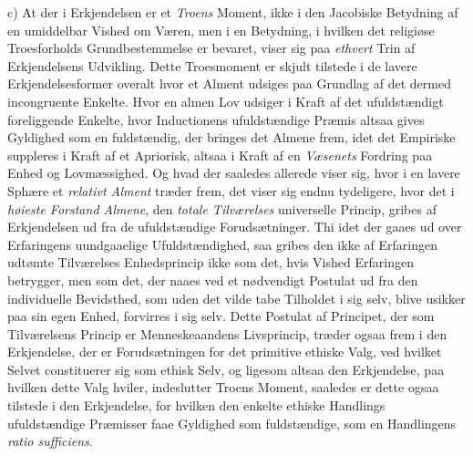 c) At der i Erkjendelsen er et \emph{Troens} Moment, ikke i den Jacobiske
Betydning af en umiddelbar Vished om Væren, men i en Betydning, i hvilken det
religiøse Troesforholds Grundbestemmelse er bevaret, viser sig paa
\emph{ethvert} Trin af Erkjendelsens Udvikling. Dette Troesmoment er skjult
tilstede i de lavere Erkjendelsesformer overalt hvor et Alment udsiges paa
Grundlag af det dermed incongruente Enkelte. Hvor en almen Lov udsiger i Kraft
af det ufuldstændigt foreliggende Enkelte, hvor Inductionens ufuldstændige
Præmis altsaa gives Gyldighed som en fuldstændig, der bringes det Almene frem,
idet det Empiriske suppleres i Kraft af et Apriorisk, altsaa i Kraft af en
\emph{Væsenets} Fordring paa Enhed og Lovmæssighed. Og hvad der saaledes
allerede viser sig, hvor i en lavere Sphære et \emph{relativt Alment} træder
frem, det viser sig endnu tydeligere, hvor det i \emph{høieste Forstand Almene},
den \emph{totale Tilværelses}
 universelle Princip, gribes af Erkjendelsen ud fra de ufuldstændige
Forudsætninger. Thi idet der gaaes ud over Erfaringens uundgaaelige
Ufuldstændighed, saa gribes den ikke af Erfaringen udtømte Tilværelses
Enhedsprincip ikke som det, hvis Vished Erfaringen betrygger, men som det, der
naaes ved et nødvendigt Postulat ud fra den individuelle Bevidsthed, som uden
det vilde tabe Tilholdet i sig selv, blive usikker paa sin egen Enhed, forvirres
i sig selv. Dette Postulat af Principet, der som Tilværelsens Princip er
Menneskeaandens Livsprincip, træder ogsaa frem i den Erkjendelse, der er
Forudsætningen for det primitive ethiske Valg, ved hvilket Selvet constituerer
sig som ethisk Selv, og ligesom altsaa den Erkjendelse, paa hvilken dette Valg
hviler, indeslutter Troens Moment, saaledes er dette ogsaa tilstede i den
Erkjendelse, for hvilken den enkelte ethiske Handlings ufuldstændige Præmisser
faae Gyldighed som fuldstændige, som en Handlingens \textit{ratio sufficiens}.

